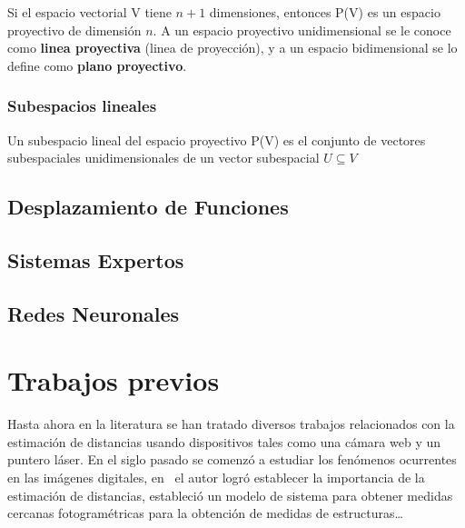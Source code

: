 \begin{definicion}
Si el espacio vectorial {V} tiene $n+1$ dimensiones, entonces {P(V)} es un espacio proyectivo de dimensión $n$. 
A un espacio proyectivo unidimensional se le conoce como \textbf{linea proyectiva} (linea de proyección), 
y a un espacio bidimensional se lo define como \textbf{plano proyectivo}.
\end{definicion}

\subsubsection{Subespacios lineales}
\begin{definicion}
Un subespacio lineal del espacio proyectivo {P(V)} es el conjunto de vectores subespaciales unidimensionales de 
un vector subespacial $U \subseteq V$
\end{definicion}


\subsection{Desplazamiento de Funciones} 

\subsection{Sistemas Expertos} 


\subsection{Redes Neuronales} 

\section{Trabajos previos}
\label{sec:trabajosprevios}
Hasta ahora en la literatura se han tratado diversos trabajos relacionados con
la estimación de distancias usando dispositivos tales como una cámara web y un
puntero láser. En el siglo pasado se comenzó a estudiar los fenómenos ocurrentes
en las imágenes digitales, en~\cite{Brown1971} el autor logró establecer la importancia de la
estimación de distancias, estableció un modelo de sistema para obtener medidas cercanas 
fotogramétricas para la obtención de medidas de estructuras\ldots
  